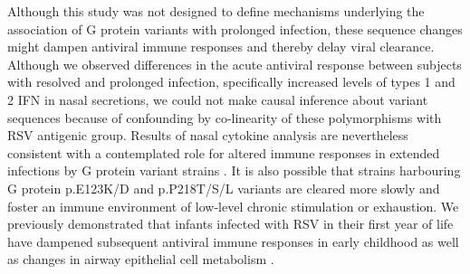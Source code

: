 \documentclass{article} %
\begin{document}
Although this study was not designed to define mechanisms underlying the association of G protein variants with prolonged infection, these sequence changes might dampen antiviral immune responses and thereby delay viral clearance. Although we observed differences in the acute antiviral response between subjects with resolved and prolonged infection, specifically increased levels of types 1 and 2 IFN in nasal secretions, we could not make causal inference about variant sequences because of confounding by co-linearity of these polymorphisms with RSV antigenic group. Results of nasal cytokine analysis are nevertheless consistent with a contemplated role for altered immune responses in extended infections by G protein variant strains
\cite{schmidt2017modulation}.
It is also possible that strains harbouring G protein p.E123K/D and p.P218T/S/L variants are cleared more slowly and foster an immune environment of low-level chronic stimulation or exhaustion. 
We previously demonstrated that infants infected with RSV in their first year of life have dampened subsequent antiviral immune responses in early childhood
\citep{chirkova2022effect}
as well as changes in airway epithelial cell metabolism 
\citep{connelly2021metabolic}.
\end{document}
